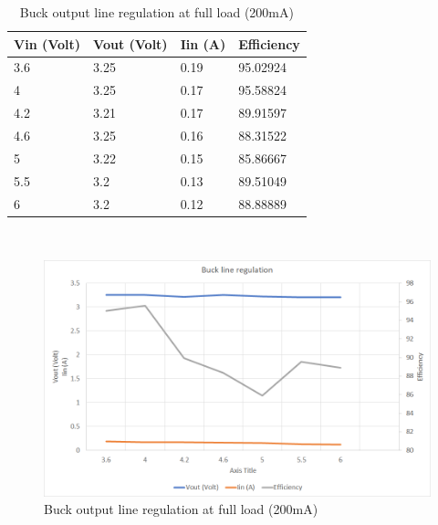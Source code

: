 \begin{table}[H]
\centering
\begin{tabular}{|l|l|l|l|}
\hline
Vin (Volt) & Vout (Volt) & Iin (A) & Efficiency \\ \hline
3.6        & 3.25        & 0.19    & 95.02924   \\ \hline
4          & 3.25        & 0.17    & 95.58824   \\ \hline
4.2        & 3.21        & 0.17    & 89.91597   \\ \hline
4.6        & 3.25        & 0.16    & 88.31522   \\ \hline
5          & 3.22        & 0.15    & 85.86667   \\ \hline
5.5        & 3.2         & 0.13    & 89.51049   \\ \hline
6          & 3.2         & 0.12    & 88.88889   \\ \hline
\end{tabular}
\caption{Buck output line regulation at full load (200mA)}
\label{table:4}
\end{table}
\\
\begin{figure}[H]
	\centering
	\includegraphics[width=\columnwidth]{IMGS/Buck output line regulation at full load (200mA).png}
	\caption{Buck output line regulation at full load (200mA)}
	\label{fig:arch}
\end{figure}


